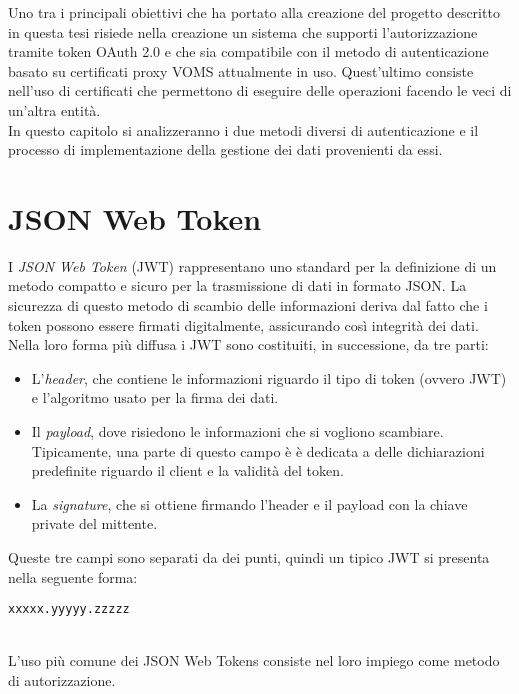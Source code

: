 Uno tra i principali obiettivi che ha portato alla creazione del progetto descritto in questa tesi 
risiede nella creazione un sistema che supporti 
l'autorizzazione tramite token OAuth 2.0 e che sia compatibile con il metodo di autenticazione basato su certificati proxy VOMS attualmente in uso.  
Quest'ultimo consiste nell'uso di certificati che permettono di eseguire delle operazioni facendo le veci di un'altra entità. 
\\ In questo capitolo si analizzeranno i due metodi diversi di autenticazione e il processo di implementazione della gestione 
dei dati provenienti da essi.

\section{JSON Web Token}
I \textit{JSON Web Token} (JWT) \cite{JWT_rfc} rappresentano uno standard per la definizione di un metodo 
compatto e sicuro per la trasmissione di dati in formato JSON. La sicurezza di questo metodo di scambio delle 
informazioni deriva dal fatto che i token possono essere firmati digitalmente, assicurando così integrità dei dati.  
\\ Nella loro forma più diffusa i JWT sono costituiti, in successione, da tre parti:
\begin{itemize}
    \item L'\textit{header}, che contiene le informazioni riguardo il tipo di token (ovvero JWT) e 
    l'algoritmo usato per la firma dei dati. 
    \item Il \textit{payload}, dove risiedono le informazioni che si vogliono scambiare. Tipicamente, una parte di questo campo è 
    è dedicata a delle dichiarazioni predefinite riguardo il client e la validità del token. 
    \item La \textit{signature}, che si ottiene firmando l'header e il payload con la chiave private del mittente.
\end{itemize}
Queste tre campi sono separati da dei punti, quindi un tipico JWT si presenta nella seguente forma:
\\ \centerline{\texttt{xxxxx.yyyyy.zzzzz}}
\\ L'uso più comune dei JSON Web Tokens consiste nel loro impiego come metodo di autorizzazione.

